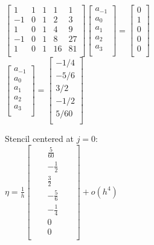 \documentclass[12pt,letter]{article}
\begin{document}
\begin{enumerate}
\begin{enumerate}
    $
    \begin{bmatrix}
      1 & 1 & 1 & 1 & 1\\
      -1 & 0 & 1 & 2 & 3\\
      1 & 0 & 1 & 4 & 9\\
      -1 & 0 & 1 & 8 & 27\\
      1 & 0 & 1 & 16 & 81\\
    \end{bmatrix}
    \begin{bmatrix}
      a_{-1}\\
      a_{0}\\
      a_{1}\\
      a_{2}\\
      a_{3}\\
    \end{bmatrix}=
    \begin{bmatrix}
      0\\
      1\\
      0\\
      0\\
      0\\
    \end{bmatrix}
    $\\

    $
    \begin{bmatrix}
      a_{-1}\\
      a_{0}\\
      a_{1}\\
      a_{2}\\
      a_{3}\\
    \end{bmatrix}=
    \begin{bmatrix}
      -1/4\\
      -5/6\\
      3/2\\
      -1/2\\
      5/60\\
    \end{bmatrix}
    $\\

    \pagebreak
    
    Stencil centered at $j=0$:\\
    $\eta=
    \frac{1}{h}
    \begin{bmatrix}
      & & \frac{5}{60} & & \\
      & & -\frac{1}{2} & &\\
      & & \frac{3}{2} & &\\
      & & -\frac{5}{6} & &\\
      & & -\frac{1}{4} & & \\
      & & 0 & & \\
      & & 0 & & \\
    \end{bmatrix}
    +o(h^4)$\\
    

\end{enumerate}
\end{enumerate}
\end{document}
